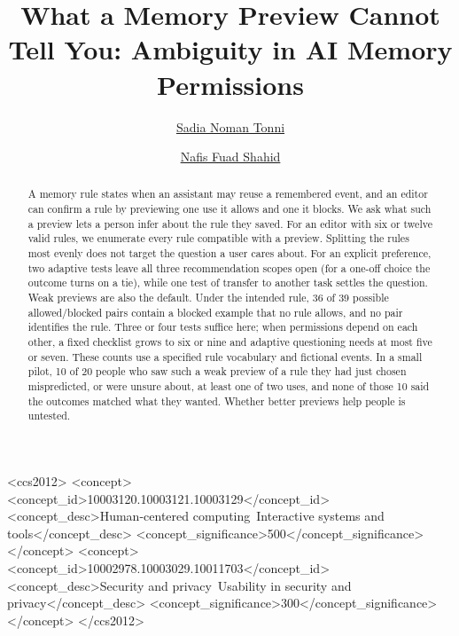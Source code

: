 \documentclass[manuscript,review]{acmart}
\begin{document}
\title{What a Memory Preview Cannot Tell You: Ambiguity in AI Memory Permissions}
\author{\texorpdfstring{\href{mailto:sadiatonni1916@gmail.com}{Sadia Noman Tonni}}{Sadia Noman Tonni}}
\author{\texorpdfstring{\href{mailto:nafisfuadshahid@gmail.com}{Nafis Fuad Shahid}}{Nafis Fuad Shahid}}
\renewcommand{\shortauthors}{Tonni and Shahid}
\begin{abstract}
A memory rule states when an assistant may reuse a remembered event, and an editor can confirm a rule by previewing one use it allows and one it blocks. We ask what such a preview lets a person infer about the rule they saved. For an editor with six or twelve valid rules, we enumerate every rule compatible with a preview. Splitting the rules most evenly does not target the question a user cares about. For an explicit preference, two adaptive tests leave all three recommendation scopes open (for a one-off choice the outcome turns on a tie), while one test of transfer to another task settles the question. Weak previews are also the default. Under the intended rule, 36 of 39 possible allowed/blocked pairs contain a blocked example that no rule allows, and no pair identifies the rule. Three or four tests suffice here; when permissions depend on each other, a fixed checklist grows to six or nine and adaptive questioning needs at most five or seven. These counts use a specified rule vocabulary and fictional events. In a small pilot, 10 of 20 people who saw such a weak preview of a rule they had just chosen mispredicted, or were unsure about, at least one of two uses, and none of those 10 said the outcomes matched what they wanted. Whether better previews help people is untested.
\end{abstract}
\begin{CCSXML}
<ccs2012>
<concept>
<concept_id>10003120.10003121.10003129</concept_id>
<concept_desc>Human-centered computing~Interactive systems and tools</concept_desc>
<concept_significance>500</concept_significance>
</concept>
<concept>
<concept_id>10002978.10003029.10011703</concept_id>
<concept_desc>Security and privacy~Usability in security and privacy</concept_desc>
<concept_significance>300</concept_significance>
</concept>
</ccs2012>
\end{CCSXML}
\maketitle
\end{document}
